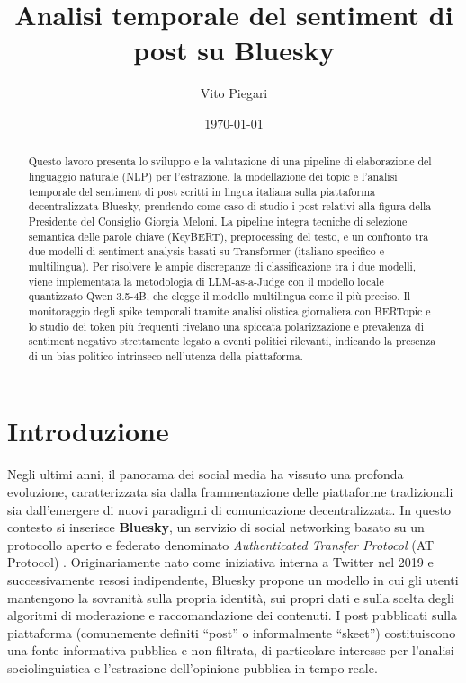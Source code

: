 \documentclass[11pt]{article}
\title{Analisi temporale del sentiment di post su Bluesky}
\author{Vito Piegari}
\date{\today}
\begin{document}
\maketitle
\newpage
\begin{abstract}
Questo lavoro presenta lo sviluppo e la valutazione di una pipeline di elaborazione del linguaggio naturale (NLP) per l'estrazione, la modellazione dei topic e l'analisi temporale del sentiment di post scritti in lingua italiana sulla piattaforma decentralizzata Bluesky, prendendo come caso di studio i post relativi alla figura della Presidente del Consiglio Giorgia Meloni. La pipeline integra tecniche di selezione semantica delle parole chiave (KeyBERT), preprocessing del testo, e un confronto tra due modelli di sentiment analysis basati su Transformer (italiano-specifico e multilingua). Per risolvere le ampie discrepanze di classificazione tra i due modelli, viene implementata la metodologia di LLM-as-a-Judge con il modello locale quantizzato Qwen 3.5-4B, che elegge il modello multilingua come il più preciso. Il monitoraggio degli spike temporali tramite analisi olistica giornaliera con BERTopic e lo studio dei token più frequenti rivelano una spiccata polarizzazione e prevalenza di sentiment negativo strettamente legato a eventi politici rilevanti, indicando la presenza di un bias politico intrinseco nell'utenza della piattaforma.
\end{abstract}
\newpage
\tableofcontents
\newpage
\section{Introduzione}
Negli ultimi anni, il panorama dei social media ha vissuto una profonda evoluzione, caratterizzata sia dalla frammentazione delle piattaforme tradizionali sia dall'emergere di nuovi paradigmi di comunicazione decentralizzata. In questo contesto si inserisce \textbf{Bluesky}, un servizio di social networking basato su un protocollo aperto e federato denominato \textit{Authenticated Transfer Protocol} (AT Protocol) \cite{atproto}. Originariamente nato come iniziativa interna a Twitter nel 2019 e successivamente resosi indipendente, Bluesky propone un modello in cui gli utenti mantengono la sovranità sulla propria identità, sui propri dati e sulla scelta degli algoritmi di moderazione e raccomandazione dei contenuti. I post pubblicati sulla piattaforma (comunemente definiti ``post'' o informalmente ``skeet'') costituiscono una fonte informativa pubblica e non filtrata, di particolare interesse per l'analisi sociolinguistica e l'estrazione dell'opinione pubblica in tempo reale.
\end{document}
